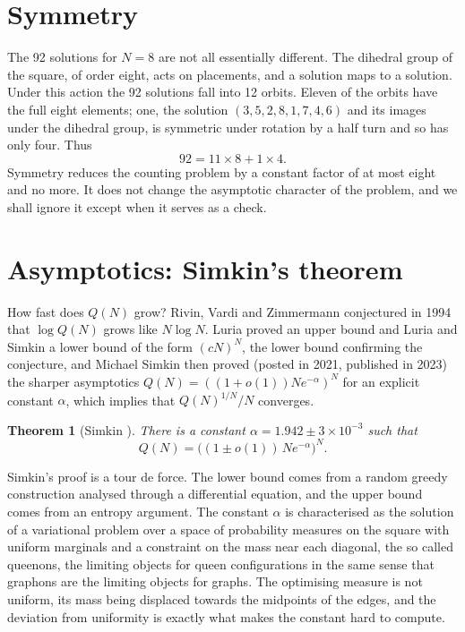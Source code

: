 \documentclass[11pt,twoside,openany]{book}
\theoremstyle{plain}
\newtheorem{theorem}{Theorem}[chapter]
\theoremstyle{definition}
\theoremstyle{remark}
\begin{document}
\section{Symmetry}

The 92 solutions for $N = 8$ are not all essentially different. The dihedral group of the square, of order eight, acts on placements, and a solution maps to a solution. Under this action the 92 solutions fall into 12 orbits. Eleven of the orbits have the full eight elements; one, the solution $(3, 5, 2, 8, 1, 7, 4, 6)$ and its images under the dihedral group, is symmetric under rotation by a half turn and so has only four. Thus
\[
92 = 11 \times 8 + 1 \times 4 .
\]
Symmetry reduces the counting problem by a constant factor of at most eight and no more. It does not change the asymptotic character of the problem, and we shall ignore it except when it serves as a check.

\section{Asymptotics: Simkin's theorem}

How fast does $Q(N)$ grow? Rivin, Vardi and Zimmermann \cite{RVZ} conjectured in 1994 that $\log Q(N)$ grows like $N \log N$. Luria \cite{Luria2017} proved an upper bound and Luria and Simkin \cite{LuriaSimkin} a lower bound of the form $(cN)^N$, the lower bound confirming the conjecture, and Michael Simkin \cite{Simkin} then proved (posted in 2021, published in 2023) the sharper asymptotics $Q(N) = ((1 + o(1)) N e^{-\alpha})^N$ for an explicit constant $\alpha$, which implies that $Q(N)^{1/N} / N$ converges.

\begin{theorem}[Simkin \cite{Simkin}]
There is a constant $\alpha = 1.942 \pm 3 \times 10^{-3}$ such that
\[
Q(N) = \big( (1 \pm o(1)) \, N e^{-\alpha} \big)^{N} .
\]
\end{theorem}

Simkin's proof is a tour de force. The lower bound comes from a random greedy construction analysed through a differential equation, and the upper bound comes from an entropy argument. The constant $\alpha$ is characterised as the solution of a variational problem over a space of probability measures on the square with uniform marginals and a constraint on the mass near each diagonal, the so called queenons, the limiting objects for queen configurations in the same sense that graphons are the limiting objects for graphs. The optimising measure is not uniform, its mass being displaced towards the midpoints of the edges, and the deviation from uniformity is exactly what makes the constant hard to compute.
\end{document}
